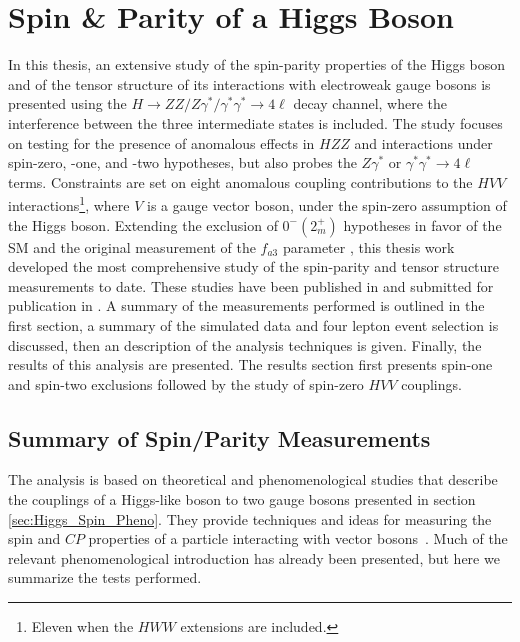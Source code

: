 \chapter{Spin \& Parity of a Higgs Boson}
\label{sec:Spin_Experiment}

In this thesis, an extensive study of the spin-parity properties of the Higgs boson and of the tensor structure of its interactions with electroweak gauge bosons is presented using the $H \to ZZ/Z\gamma^*/\gamma^*\gamma^*\to4\ell$ decay channel, where the interference between the three intermediate states is included. The study focuses on testing for the presence of anomalous effects in $HZZ$ and interactions under spin-zero, -one, and -two hypotheses, but also probes the $Z\gamma^*$ or $\gamma^*\gamma^*\to4\ell$ terms. Constraints are set on eight anomalous coupling contributions to the $HVV$ interactions\footnote{Eleven when the $HWW$ extensions are included.}, where $V$ is a gauge vector boson, under the spin-zero assumption of the Higgs boson. Extending the exclusion of $0^{-}\left(2_{m}^{+}\right)$ hypotheses in favor of the SM and the original measurement of the $f_{a3}$ parameter \cite{Chatrchyan:2012jja}, this thesis work developed the most comprehensive study of the spin-parity and tensor structure measurements to date. These studies have been published in \cite{Chatrchyan:2013mxa} and submitted for publication in \cite{Khachatryan:2014kca}. A summary of the measurements performed is outlined in the first section, a summary of the simulated data and four lepton event selection is discussed, then an description of the analysis techniques is given. Finally, the results of this analysis are presented. The results section first presents spin-one and spin-two exclusions followed by the study of spin-zero $HVV$ couplings.

\section{Summary of Spin/Parity Measurements}
\label{sec:General_Spin_Parity}

The analysis is based on theoretical and phenomenological studies that describe the couplings of a Higgs-like boson to two gauge bosons presented in section \ref{sec:Higgs_Spin_Pheno}. They provide techniques and ideas for measuring the spin and $CP$ properties of a particle interacting with vector bosons~\cite{Gao:2010qx,Bolognesi:2012mm,Anderson:2013afp}. Much of the relevant phenomenological introduction has already been presented, but here we summarize the tests performed.

